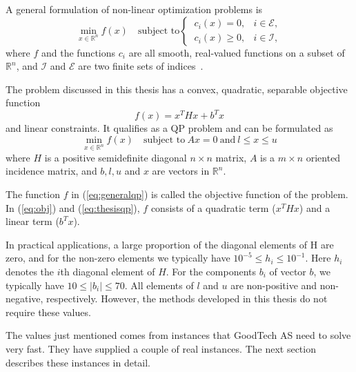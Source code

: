 A general formulation of non-linear optimization problems is
\begin{equation}
    \label{eq:generalqp}
    \min_{x \in \mathbb{R}^n} f(x) \quad \textrm{subject to}
    \begin{cases}
        ~c_i(x) = 0,   & i \in \mathcal{E}, \\
        ~c_i(x) \ge 0, & i \in \mathcal{I},
    \end{cases}
\end{equation}
where $f$ and the functions $c_i$ are all smooth, real-valued functions on a
subset of $\mathbb{R}^n$, and $\mathcal{I}$ and $\mathcal{E}$ are two finite
sets of indices~\cite{nocedal}.

The problem discussed in this thesis has a convex, quadratic, separable
objective function
\begin{equation}
    \label{eq:obj}
    f(x) = x^T H x + b^T x
\end{equation}
and linear constraints. It qualifies as a QP problem and can be formulated as
\begin{equation}
    \label{eq:thesisqp}
    \min_{x \in \mathbb{R}^n} f(x)
    \quad \textrm{subject to}
    ~
    Ax = 0
    ~
    \textrm{and}
    ~
    l \le x \le u
\end{equation}
where $H$ is a positive semidefinite diagonal $n \times n$ matrix, $A$ is a
$m \times n$ oriented incidence matrix, and $b, l, u$ and $x$ are vectors in
$\mathbb{R}^n$.

The function $f$ in (\ref{eq:generalqp}) is called the objective function of
the problem. In (\ref{eq:obj}) and (\ref{eq:thesisqp}), $f$ consists of a
quadratic term ($x^T H x$) and a linear term ($b^T x$).

In practical applications, a large proportion of the diagonal elements of H are
zero, and for the non-zero elements we typically have
$10^{-5} \le h_i \le 10^{-1}$. Here $h_i$ denotes the $i$th diagonal element of
$H$. For the components $b_i$ of vector $b$, we typically have
$10 \le |b_i| \le 70$. All elements of $l$ and $u$ are non-positive 
and non-negative, respectively. However, the methods developed in this thesis
do not require these values.

The values just mentioned comes from instances that GoodTech AS need to solve
very fast.
They have supplied a couple of real instances.
The next section describes these instances in detail.
